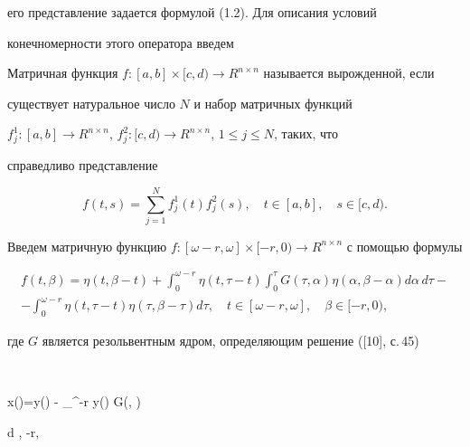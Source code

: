 его представление задается формулой (1.2).  Для описания условий


конечномерности этого оператора введем





\begin{defnnonum}


Матричная функция $f : [a,b] \times[c,d)


\rightarrow R^{n \times n}$ называется вырожденной, если


существует натуральное число $N$ и набор матричных функций


$f_{j}^{1} : [a,b] \rightarrow R^{n \times n}$, $f_{j}^{2} : [c,d)


\rightarrow R^{n \times n}$, $1 \leq j \leq N$, таких, что


справедливо представление


$$


f(t,s) = \sum_{j=1}^{N}f_{j}^{1}(t)


f_{j}^{2}(s), \quad t \in[a,b], \quad s \in[c,d).


$$


\end{defnnonum}





Введем матричную функцию $f : [\omega -r, \omega] \times[-r,0)


\rightarrow R^{n \times n}$ с помощью формулы


\begin{multline}


f(t, \beta) = \eta(t, \beta-t) + \int_{0}^{\omega-r} \eta(t, \tau-t)


\int_{0}^{\tau} G(\tau, \alpha) \eta(\alpha, \beta- \alpha) d \alpha\, d


\tau- \\


- \int_{0}^{\omega-r} \eta(t, \tau-t) \eta(\tau, \beta- \tau) d \tau,


\quad t \in[\omega-r, \omega], \quad \beta \in[-r,0),


\end{multline}


где $G$ является резольвентным ядром, определяющим решение ([10], с.\,45)


$$


x(\alpha)=y(\alpha) - \int_{\alpha}^{\omega-r} y(\tau) G(\tau, \alpha)


d \tau,  \leq \alpha \leq \omega-r,


